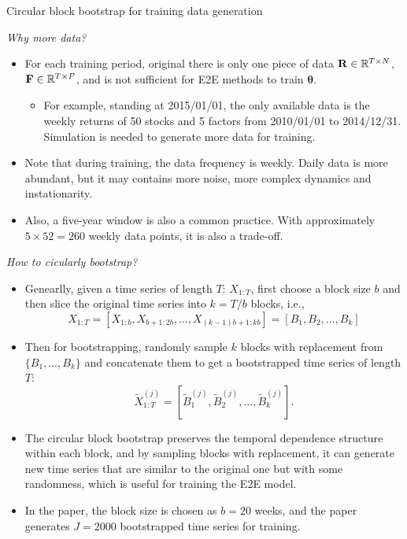 \documentclass[10pt,aspectratio=169]{beamer}
\newcommand{\Nassets}{N}
\newcommand{\Param}{\theta}
\begin{document}
\begin{frame}[allowframebreaks]{Circular block bootstrap \parencite{PolitisRomano1991CBB} for training data generation}
  \footnotesize 

  \emph {Why more data?}

  \begin{itemize}
    \item For each training period, original there is only one piece of data $\mathbf{R} \in \RR^{T\times \Nassets}$, $\mathbf{F} \in \mathbb{R}^{T\times P}$, and is not sufficient for E2E methods to train $\boldsymbol \Param$.
    \begin{itemize}
      \small 
      \item  For example, standing at 2015/01/01, the only available data is the weekly returns of 50 stocks and 5 factors from 2010/01/01 to 2014/12/31. Simulation is needed to generate more data for training.
    \end{itemize}
    \item Note that during training, the data frequency is weekly. Daily data is more abundant, but it may contains more noise, more complex dynamics and instationarity.
    \item Also, a five-year window is also a common practice. With approximately $5\times 52 = 260$ weekly data points, it is also a trade-off.
  \end{itemize}

  \break

  \emph{How to cicularly bootstrap?}
  \begin{itemize}

    \item Genearlly, given a time series of length $T$: $X_{1:T}$, first choose a block size $b$ and then slice the original time series into $k = T/b$ blocks, i.e., 
    \[
        X_{1:T} = [X_{1:b}, X_{b+1:2b}, \ldots, X_{(k-1)b+1:kb}] = [B_1, B_2, \ldots, B_k]
      \]
    \item Then for bootstrapping, randomly sample $k$ blocks with replacement from $\{B_1,\ldots,B_k\}$ and concatenate them to get a bootstrapped time series of length $T$: 
    \[\tilde{X}_{1:T}^{(j)} = [\tilde{B}_1^{(j)}, \tilde{B}_2^{(j)}, \ldots, \tilde{B}_k^{(j)}].\]

    \item The circular block bootstrap preserves the temporal dependence structure within each block, and by sampling blocks with replacement, it can generate new time series that are similar to the original one but with some randomness, which is useful for training the E2E model.

  \end{itemize}

  
  \begin{itemize}
      \item In the paper, the block size is chosen as $b=20$ weeks, and the paper generates $J=2000$ bootstrapped time series for training.
  \end{itemize}

\end{frame}
\end{document}

